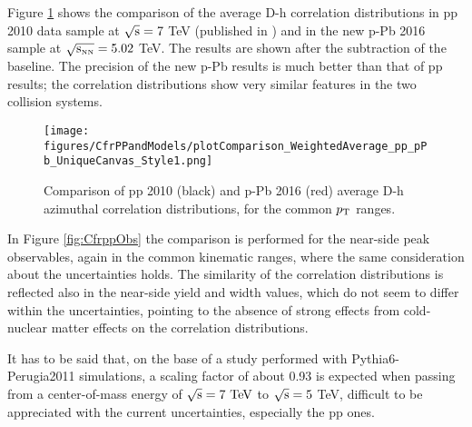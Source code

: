 Figure \ref{fig:CfrppCorrel} shows the comparison of the average D-h correlation distributions in pp 2010 data sample at $\rm{\sqrt{s}= 7}$ TeV (published in \cite{ALICEDhcorr}) and in the new p-Pb 2016 sample at $\rm{\sqrt{s_{\rm \scriptscriptstyle NN}}= 5.02}$ TeV. The results are shown after the subtraction of the baseline. The precision of the new p-Pb results is much better than that of pp results; the correlation distributions show very similar features in the two collision systems. 

\begin{figure}[!htbp]
\centering
{\texttt{[image: figures/CfrPPandModels/plotComparison\_WeightedAverage\_pp\_pPb\_UniqueCanvas\_Style1.png]}}
\caption{Comparison of pp 2010 (black) and p-Pb 2016 (red) average D-h azimuthal correlation distributions, for the common $p_{\rm T}$ ranges.}
\label{fig:CfrppCorrel}
\end{figure}

In Figure \ref{fig:CfrppObs} the comparison is performed for the near-side peak observables, again in the common kinematic ranges, where the same consideration about the uncertainties holds. The similarity of the correlation distributions is reflected also in the near-side yield and width values, which do not seem to differ within the uncertainties, pointing to the absence of strong effects from cold-nuclear matter effects on the correlation distributions.

It has to be said that, on the base of a study performed with Pythia6-Perugia2011 simulations, a scaling factor of about 0.93 is expected when passing from a center-of-mass energy of $\rm{\sqrt{s}= 7 ~ TeV}$ to $\rm{\sqrt{s}= 5}$ TeV, difficult to be appreciated with the current uncertainties, especially the pp ones.

